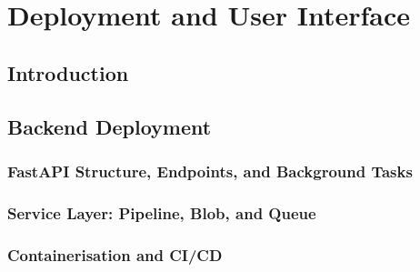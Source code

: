 \documentclass[12pt,a4paper]{report}
\begin{document}
\chapter{Deployment and User Interface}
\label{ch:deployment}

\section{Introduction}
\label{sec:ch6-intro}

\section{Backend Deployment}
\label{sec:backend-deployment}

  \subsection{FastAPI Structure, Endpoints, and Background Tasks}
  \label{subsec:fastapi-structure}

  \subsection{Service Layer: Pipeline, Blob, and Queue}
  \label{subsec:service-layer}

  \subsection{Containerisation and CI/CD}
  \label{subsec:docker}
\end{document}
